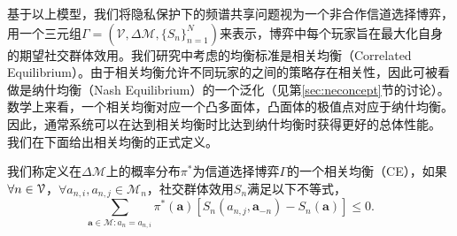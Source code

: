 
基于以上模型，我们将隐私保护下的频谱共享问题视为一个非合作信道选择博弈，用一个三元组$\Gamma=\left(\mathcal{V},\Delta\mathcal{M},\{S_n\}_{n=1}^N\right)$来表示，博弈中每个玩家旨在最大化自身的期望社交群体效用。我们研究中考虑的均衡标准是{\kaishu 相关均衡（Correlated Equilibrium）}\cite{Aumann}。由于相关均衡允许不同玩家的之间的策略存在相关性，因此可被看做是{\kaishu 纳什均衡（Nash Equilibrium）}的一个泛化（见第\ref{sec:neconcept}节的讨论）。数学上来看，一个相关均衡对应一个凸多面体，凸面体的极值点对应于纳什均衡。因此，通常系统可以在达到相关均衡时比达到纳什均衡时获得更好的总体性能。
我们在下面给出相关均衡的正式定义。


\begin{df}[相关均衡]
我们称定义在$\Delta\mathcal{M}$上的概率分布$\pi^*$为信道选择博弈$\Gamma$的一个相关均衡（CE），如果$\forall n\in\mathcal{V}$，$\forall a_{n,i},a_{n,j}\in\mathcal{M}_n$，社交群体效用$S_n$满足以下不等式，
\begin{equation}
\sum_{\textbf{a}\in\mathcal{M}:a_n=a_{n,i}}\pi^*(\textbf{a})\left[S_n(a_{n,j},\textbf{a}_{-n})-S_n(\textbf{a})\right]\leq0.
\end{equation}
\end{df}

